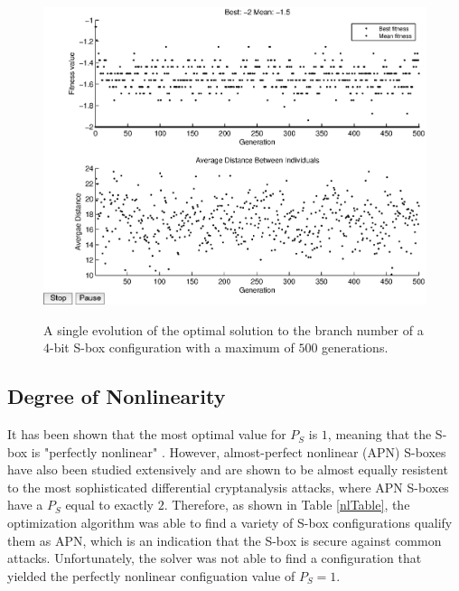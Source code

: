 \documentclass[11pt]{article}
\begin{document}
\begin{figure}
	\centering
	\includegraphics[scale=0.5]{images/bn_results16.eps} \\
	\label{bn16}
\caption{A single evolution of the optimal solution to the branch number of a $4$-bit S-box configuration with a maximum of $500$ generations.}
\end{figure}

\subsection{Degree of Nonlinearity}
It has been shown that the most optimal value for $P_S$ is $1$, meaning that the S-box is "perfectly nonlinear" \cite{ProvableSecurity}. However, almost-perfect nonlinear (APN) S-boxes have also been studied extensively and are shown to be almost equally resistent to the most sophisticated differential cryptanalysis attacks, where APN S-boxes have a $P_S$ equal to exactly $2$. Therefore, as shown in Table \ref{nlTable}, the optimization algorithm was able to find a variety of S-box configurations qualify them as APN, which is an indication that the S-box is secure against common attacks. Unfortunately, the solver was not able to find a configuration that yielded the perfectly nonlinear configuation value of $P_S = 1$. 
\end{document}
